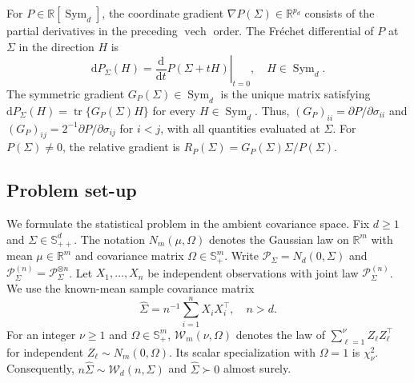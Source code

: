 \documentclass[12pt,a4paper]{article}
\theoremstyle{plain}
\theoremstyle{definition}
\newcommand{\R}{\mathbb{R}}
\newcommand{\Smat}{\mathbb{S}}
\newcommand{\Sym}{\operatorname{Sym}}
\newcommand{\tr}{\operatorname{tr}}
\newcommand{\vech}{\operatorname{vech}}
\newcommand{\Sighat}{\hat{\Sigma}}
\begin{document}
For $P\in\R[\Sym_d]$, the coordinate gradient $\nabla P(\Sigma)\in\R^{p_d}$ consists of the partial derivatives in the preceding $\vech$ order.
The Fr\'echet differential of $P$ at $\Sigma$ in the direction $H$ is
\begin{equation*}
    \mathrm{d}P_\Sigma(H)
    =
    \left.\frac{\mathrm{d}}{\mathrm{d}t}P(\Sigma+tH)\right|_{t=0}
    ,
    \quad
    H\in\Sym_d
    .
\end{equation*}
The symmetric gradient $G_P(\Sigma)\in\Sym_d$ is the unique matrix satisfying $\mathrm{d}P_\Sigma(H)=\tr\{G_P(\Sigma)H\}$ for every $H\in\Sym_d$.
Thus, $(G_P)_{ii}=\partial P/\partial\sigma_{ii}$ and $(G_P)_{ij}=2^{-1}\partial P/\partial\sigma_{ij}$ for $i<j$, with all quantities evaluated at $\Sigma$.
For $P(\Sigma)\ne0$, the relative gradient is $R_P(\Sigma)=G_P(\Sigma)\Sigma/P(\Sigma)$.

\subsection{Problem set-up}

We formulate the statistical problem in the ambient covariance space.
Fix $d\ge1$ and $\Sigma\in\Smat^d_{++}$.
The notation $N_m(\mu,\Omega)$ denotes the Gaussian law on $\R^m$ with mean $\mu\in\R^m$ and covariance matrix $\Omega\in\Smat^m_+$.
Write $\mathcal{P}_\Sigma=N_d(0,\Sigma)$ and $\mathcal{P}_\Sigma^{(n)}=\mathcal{P}_\Sigma^{\otimes n}$.
Let $X_1,\ldots,X_n$ be independent observations with joint law $\mathcal{P}_{\Sigma}^{(n)}$.
We use the known-mean sample covariance matrix
\begin{equation}
\label{eq:sample-covariance}
    \Sighat
    =
    n^{-1}\sum_{i=1}^nX_iX_i^\top
    ,
    \quad
    n>d
    .
\end{equation}
For an integer $\nu\ge1$ and $\Omega\in\Smat^m_+$, $\mathcal{W}_m(\nu,\Omega)$ denotes the law of $\sum_{\ell=1}^{\nu}Z_\ell Z_\ell^\top$ for independent $Z_\ell\sim N_m(0,\Omega)$.
Its scalar specialization with $\Omega=1$ is $\chi^2_\nu$.
Consequently, $n\Sighat\sim\mathcal{W}_d(n,\Sigma)$ and $\Sighat\succ0$ almost surely.
\end{document}
